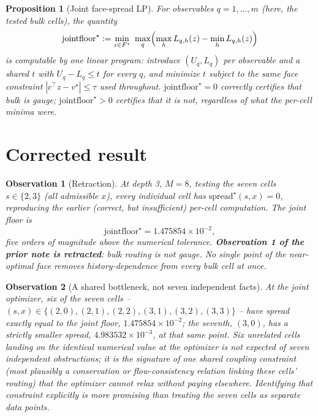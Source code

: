 \documentclass[11pt,a4paper]{article}
\newtheorem{proposition}{Proposition}
\newtheorem{observation}{Observation}
\begin{document}
\begin{proposition}[Joint face-spread LP]
For observables $q=1,\dots,m$ (here, the tested bulk cells), the quantity
\[
\mathrm{jointfloor}^\star := \min_{z\in F^\star}\ \max_{q}\Bigl(\max_h L_{q,h}(z) - \min_h L_{q,h}(z)\Bigr)
\]
is computable by one linear program: introduce $(U_q,L_q)$ per observable
and a shared $t$ with $U_q-L_q\le t$ for every $q$, and minimize $t$ subject
to the same face constraint $|c^\top z-v^\star|\le\tau$ used throughout.
$\mathrm{jointfloor}^\star=0$ correctly certifies that bulk is gauge;
$\mathrm{jointfloor}^\star>0$ certifies that it is not, regardless of what
the per-cell minima were.
\end{proposition}

\section{Corrected result}

\begin{observation}[Retraction]
At depth 3, $M=8$, testing the seven cells $s\in\{2,3\}$ (all admissible
$x$), every individual cell has $\mathrm{spread}^\star(s,x)=0$, reproducing
the earlier (correct, but insufficient) per-cell computation. The joint
floor is
\[
\mathrm{jointfloor}^\star = 1.475854\times10^{-2},
\]
five orders of magnitude above the numerical tolerance. \textbf{Observation
1 of the prior note is retracted}: bulk routing is not gauge. No single
point of the near-optimal face removes history-dependence from every bulk
cell at once.
\end{observation}

\begin{observation}[A shared bottleneck, not seven independent facts]
At the joint optimizer, six of the seven cells --
$(s,x)\in\{(2,0),(2,1),(2,2),(3,1),(3,2),(3,3)\}$ -- have spread exactly
equal to the joint floor, $1.475854\times10^{-2}$; the seventh, $(3,0)$, has
a strictly smaller spread, $4.983532\times10^{-3}$, at that same point.
Six unrelated cells landing on the identical numerical value at the
optimizer is not expected of seven independent obstructions; it is the
signature of one shared coupling constraint (most plausibly a conservation
or flow-consistency relation linking these cells' routing) that the
optimizer cannot relax without paying elsewhere. Identifying that
constraint explicitly is more promising than treating the seven cells as
separate data points.
\end{observation}
\end{document}

